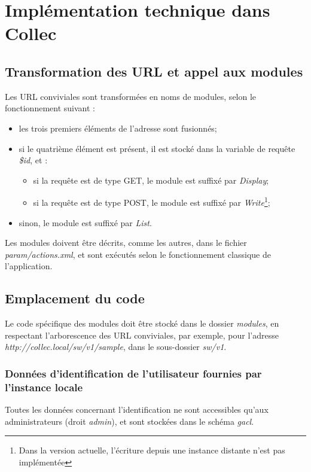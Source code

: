 \chapter{Implémentation technique dans Collec}
\section{Transformation des URL et appel aux modules}
Les URL conviviales sont transformées en noms de modules, selon le fonctionnement suivant :
\begin{itemize}
\item les trois premiers éléments de l'adresse sont fusionnés;
\item si le quatrième élément est présent, il est stocké dans la variable de requête \textit{\$id}, et :
\begin{itemize}
\item si la requête est de type GET, le module est suffixé par \textit{Display};
\item si la requête est de type POST, le module est suffixé par \textit{Write}\footnote{Dans la version actuelle, l'écriture depuis une instance distante n'est pas implémentée};
\end{itemize}
\item sinon, le module est suffixé par \textit{List}.
\end{itemize}

Les modules doivent être décrits, comme les autres, dans le fichier \textit{param/actions.xml}, et sont exécutés selon le fonctionnement classique de l'application.

\section{Emplacement du code}
Le code spécifique des modules doit être stocké dans le dossier \textit{modules}, en respectant l'arborescence des URL conviviales, par exemple, pour l'adresse \textit{http://collec.local/sw/v1/sample}, dans le sous-dossier \textit{sw/v1}.

\subsection{Données d'identification de l'utilisateur fournies par l'instance locale}

Toutes les données concernant l'identification ne sont accessibles qu'aux administrateurs (droit \textit{admin}), et sont stockées dans le schéma \textit{gacl}.

